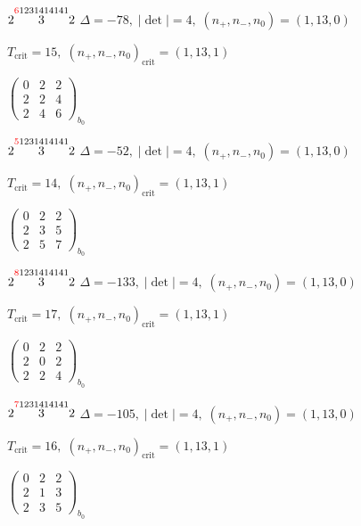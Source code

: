 \documentclass[10pt]{article}
\begin{document}
\smallskip

$2\overset{\textcolor{red}{6}1231414141}{3}2$ \quad $\Delta=-78,\; |\det|=4,\; (n_+,n_-,n_0)=(1,13,0)$

\hspace{1em}$T_{\text{crit}}=15,\; (n_+,n_-,n_0)_{\text{crit}}=(1,13,1)$

\hspace{2em}$\left(\begin{smallmatrix}0 & 2 & 2 \\ 2 & 2 & 4 \\ 2 & 4 & 6\end{smallmatrix}\right)_{\!b_0}$

$2\overset{\textcolor{red}{5}1231414141}{3}2$ \quad $\Delta=-52,\; |\det|=4,\; (n_+,n_-,n_0)=(1,13,0)$

\hspace{1em}$T_{\text{crit}}=14,\; (n_+,n_-,n_0)_{\text{crit}}=(1,13,1)$

\hspace{2em}$\left(\begin{smallmatrix}0 & 2 & 2 \\ 2 & 3 & 5 \\ 2 & 5 & 7\end{smallmatrix}\right)_{\!b_0}$

$2\overset{\textcolor{red}{8}1231414141}{3}2$ \quad $\Delta=-133,\; |\det|=4,\; (n_+,n_-,n_0)=(1,13,0)$

\hspace{1em}$T_{\text{crit}}=17,\; (n_+,n_-,n_0)_{\text{crit}}=(1,13,1)$

\hspace{2em}$\left(\begin{smallmatrix}0 & 2 & 2 \\ 2 & 0 & 2 \\ 2 & 2 & 4\end{smallmatrix}\right)_{\!b_0}$

$2\overset{\textcolor{red}{7}1231414141}{3}2$ \quad $\Delta=-105,\; |\det|=4,\; (n_+,n_-,n_0)=(1,13,0)$

\hspace{1em}$T_{\text{crit}}=16,\; (n_+,n_-,n_0)_{\text{crit}}=(1,13,1)$

\hspace{2em}$\left(\begin{smallmatrix}0 & 2 & 2 \\ 2 & 1 & 3 \\ 2 & 3 & 5\end{smallmatrix}\right)_{\!b_0}$
\end{document}
